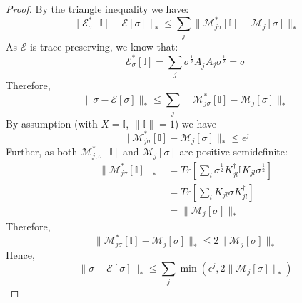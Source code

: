 \begin{proof}
    By the triangle inequality we have:
    \begin{equation}
        \|\mathcal{E}^*_{\sigma}[\mathbb{I}]-\mathcal{E}[\sigma]\|_* \leq \sum_j \|\mathcal{M}^*_{j\sigma}[\mathbb{I}]-\mathcal{M}_{j}[\sigma]\|_*
    \end{equation}
    As $\mathcal{E}$ is trace-preserving, we know that:
    \begin{equation}
        \mathcal{E}^*_{\sigma}[\mathbb{I}] = \sum_{j} \sigma^{\frac{1}{2}}A^{\dagger}_{j} A_{j}\sigma^{\frac{1}{2}} = \sigma
    \end{equation}
    Therefore,
    \begin{equation}
        \|\sigma - \mathcal{E}[\sigma]\|_* \leq \sum_j \|\mathcal{M}^*_{j\sigma}[\mathbb{I}]-\mathcal{M}_{j}[\sigma]\|_*
    \end{equation}
    By assumption (with $X=\mathbb{I}$, $\|\mathbb{I}\|=1$) we have
    \begin{equation}
        \|\mathcal{M}^*_{j\sigma}[\mathbb{I}]-\mathcal{M}_{j}[\sigma]\|_* \leq \epsilon^j
    \end{equation}
    Further, as both
$\mathcal{M}_{j,\sigma}^{*}[\mathbb{I}]$ and
$\mathcal{M}_j[\sigma]$ are positive semidefinite:
    \begin{align}
        \|\mathcal{M}^*_{j\sigma}[\mathbb{I}]\|_* &= Tr\left[\sum_l \sigma^{\frac{1}{2}} K_{jl}^{\dagger} \mathbb{I} K_{jl} \sigma^{\frac{1}{2}}\right]\\
        &= Tr\left[\sum_l K_{jl}\sigma K_{jl}^{\dagger}\right]\\
        &= \|\mathcal{M}_{j}[\sigma]\|_*
    \end{align}
    Therefore,
    \begin{equation}
         \|\mathcal{M}^*_{j\sigma}[\mathbb{I}]-\mathcal{M}_{j}[\sigma]\|_* \leq 2\|\mathcal{M}_{j}[\sigma]\|_*
    \end{equation}
    Hence,
    \begin{equation}
        \|\sigma-\mathcal{E}[\sigma]\|_* \leq \sum_j \min \left(\epsilon^j, 2\|\mathcal{M}_{j}[\sigma]\|_*\right)
    \end{equation}
\end{proof}

